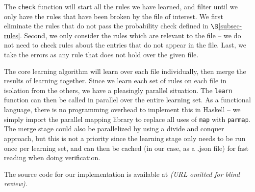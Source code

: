 The \lstinline{check} function will start all the rules we have learned, 
and filter until we only have the rules that have been broken by the file 
of interest. We first eliminate the rules 
that do not pass the probability check defined in $\S$\ref{subsec-rules}.
Second, we only consider the rules which are relevant to the file -- we 
do not need to check rules about the entries 
that do not appear in the file.
Last, we take the errors 
as any rule that does not hold over the given file.





The core learning algorithm will learn over each file individually, 
then merge the results of learning together. 
Since we learn each set of rules on each file in isolation from the others, we have a pleasingly parallel situation.
The \lstinline{learn} function can then be called in parallel over the entire learning set.
As a functional language, there is no programming overhead to implement
this in Haskell -- we simply import the parallel mapping library \cite{parallel} to replace all uses of  \lstinline{map} with \lstinline{parmap}.
The merge stage could also be parallelized by using a divide and conquer approach, but this is not a priority since the learning stage only needs to be run once per learning set, and can then be cached (in our case, as a .json file) for fast reading when doing verification.

The source code for our implementation is available at {\em (URL omitted for blind review)}.
